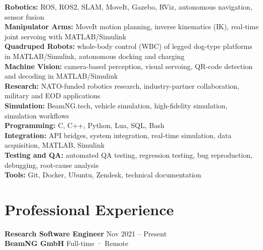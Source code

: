 \documentclass[11pt,a4paper]{article}
\begin{document}
{\small
\textbf{\color{PrimaryColor}Robotics:} ROS, ROS2, SLAM, MoveIt, Gazebo, RViz, autonomous navigation, sensor fusion\\
\textbf{\color{PrimaryColor}Manipulator Arms:} MoveIt motion planning, inverse kinematics (IK), real-time joint servoing with MATLAB/Simulink\\
\textbf{\color{PrimaryColor}Quadruped Robots:} whole-body control (WBC) of legged dog-type platforms in MATLAB/Simulink, autonomous docking and charging\\
\textbf{\color{PrimaryColor}Machine Vision:} camera-based perception, visual servoing, QR-code detection and decoding in MATLAB/Simulink\\
\textbf{\color{PrimaryColor}Research:} NATO-funded robotics research, industry-partner collaboration, military and EOD applications\\
\textbf{\color{PrimaryColor}Simulation:} BeamNG.tech, vehicle simulation, high-fidelity simulation, simulation workflows\\
\textbf{\color{PrimaryColor}Programming:} C, C++, Python, Lua, SQL, Bash\\
\textbf{\color{PrimaryColor}Integration:} API bridges, system integration, real-time simulation, data acquisition, MATLAB, Simulink\\
\textbf{\color{PrimaryColor}Testing and QA:} automated QA testing, regression testing, bug reproduction, debugging, root-cause analysis\\
\textbf{\color{PrimaryColor}Tools:} Git, Docker, Ubuntu, Zendesk, technical documentation
}

\section*{Professional Experience}

\textbf{\color{PrimaryColor}Research Software Engineer} \hfill Nov 2021 -- Present\\
\textbf{BeamNG GmbH} \hfill Full-time · Remote
\end{document}
